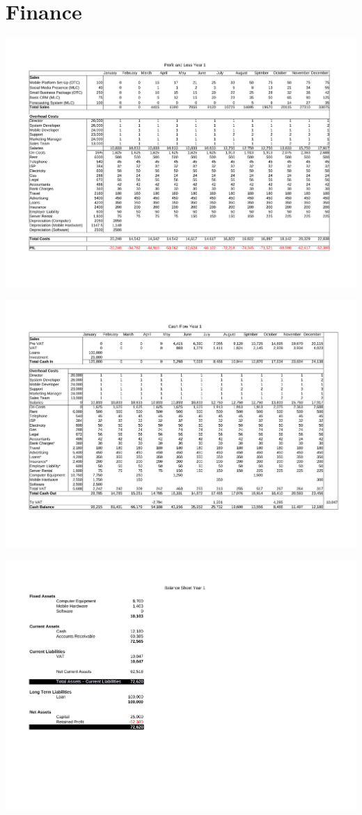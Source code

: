 \documentclass[DIV=calc, paper=a4, fontsize=11pt]{scrartcl}	 %
\begin{document}
\section{Finance}

\begin{landscape}
\centering
\includegraphics[width=\linewidth]{pl-y1.pdf}
\newpage\hfill\newpage

\includegraphics[width=\linewidth]{cashflow-y1.pdf}
\newpage\hfill\newpage

\includegraphics[width=\linewidth]{balance-y1.pdf}
\newpage\hfill\newpage


\end{landscape}
\end{document}
